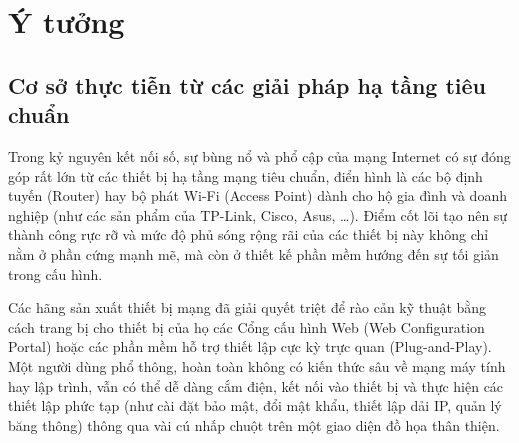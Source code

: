 \section{Ý tưởng}\label{sec:y_tuong}

    \subsection{Cơ sở thực tiễn từ các giải pháp hạ tầng tiêu chuẩn}
        Trong kỷ nguyên kết nối số, sự bùng nổ và phổ cập của mạng Internet có sự đóng góp rất lớn từ các thiết bị hạ tầng mạng tiêu chuẩn, điển hình là các bộ định tuyến (Router) hay bộ phát Wi-Fi (Access Point) dành cho hộ gia đình và doanh nghiệp (như các sản phẩm của TP-Link, Cisco, Asus, \dots). Điểm cốt lõi tạo nên sự thành công rực rỡ và mức độ phủ sóng rộng rãi của các thiết bị này không chỉ nằm ở phần cứng mạnh mẽ, mà còn ở thiết kế phần mềm hướng đến sự tối giản trong cấu hình.

Các hãng sản xuất thiết bị mạng đã giải quyết triệt để rào cản kỹ thuật bằng cách trang bị cho thiết bị của họ các Cổng cấu hình Web (Web Configuration Portal) hoặc các phần mềm hỗ trợ thiết lập cực kỳ trực quan (Plug-and-Play). Một người dùng phổ thông, hoàn toàn không có kiến thức sâu về mạng máy tính hay lập trình, vẫn có thể dễ dàng cắm điện, kết nối vào thiết bị và thực hiện các thiết lập phức tạp (như cài đặt bảo mật, đổi mật khẩu, thiết lập dải IP, quản lý băng thông) thông qua vài cú nhấp chuột trên một giao diện đồ họa thân thiện.


